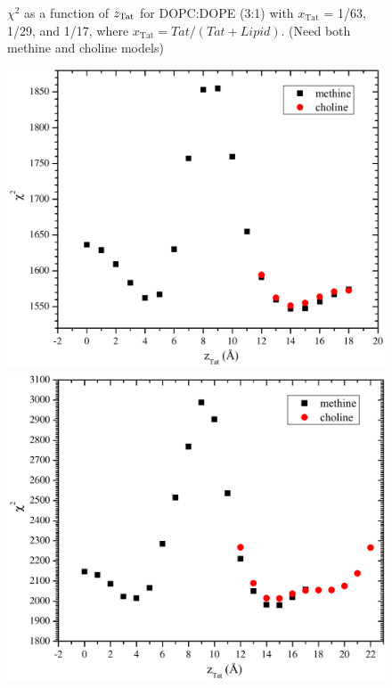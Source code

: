 \begin{figure}[htbp]
  \caption{$\chi^2$ as a function of $z_\textrm{Tat}$ for DOPC:DOPE (3:1) with 
  $x_\textrm{Tat}$ = 1/63, 1/29, and 1/17, where $x_\textrm{Tat}=Tat/(Tat+Lipid)$.
  (Need both methine and choline models)}
  \label{fig:DOPCDOPE3to1_Tat_X2}
\end{figure}
\begin{figure}[htbp]
  \centering
  \includegraphics[scale=0.3]{figures/Tat/SDP_Results/X2/DOPCDOPE1to1_Tat_62to1_3p0_X2}
  \includegraphics[scale=0.3]{figures/Tat/SDP_Results/X2/DOPCDOPE1to1_Tat_28to1_3p0_X2}

\end{figure}
